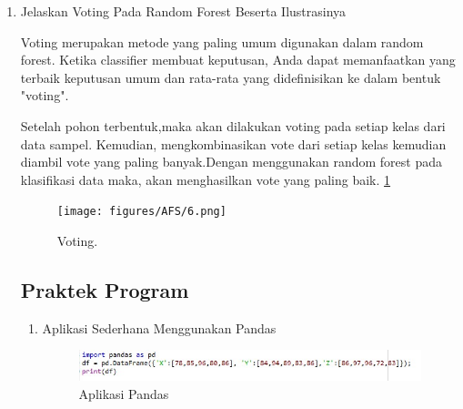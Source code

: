 \begin{enumerate}
 b= 1

 c= 1

 d= 3

Kemudian kita dapat mencari nilai Recall, Precision, accuracy dan Error Rate

 Recall =3/(1+3) = 0,75

 Precision = 3/(1+3) = 0,75

 Accuracy =(5+3)/(5+1+1+3) = 0,8

 Error Rate =(1+1)/(5+1+1+3) = 0,2

\item Jelaskan Voting Pada Random Forest Beserta Ilustrasinya 
\par Voting merupakan metode yang paling umum digunakan dalam random forest. Ketika classifier membuat keputusan, Anda dapat memanfaatkan yang terbaik keputusan umum dan rata-rata yang didefinisikan ke dalam bentuk "voting".
\par Setelah pohon terbentuk,maka akan dilakukan voting pada setiap kelas dari data sampel. Kemudian, mengkombinasikan vote dari setiap kelas kemudian diambil vote yang paling banyak.Dengan menggunakan random forest pada klasifikasi data maka, akan menghasilkan vote yang paling baik. \ref{AFS6}
		\begin{figure}[ht]
		\centerline{\texttt{[image: figures/AFS/6.png]}}
		\caption{Voting.}
		\label{AFS6}
		\end{figure}



\subsection{Praktek Program}
\begin{enumerate}
\item Aplikasi Sederhana Menggunakan Pandas
	\begin{figure}[ht]
	\centering
	\includegraphics[scale=0.5]{figures/AFS/praktek1.jpg}
	\caption{Aplikasi Pandas}
	\label{contoh}
	\end{figure}


\end{enumerate}
\end{enumerate}
